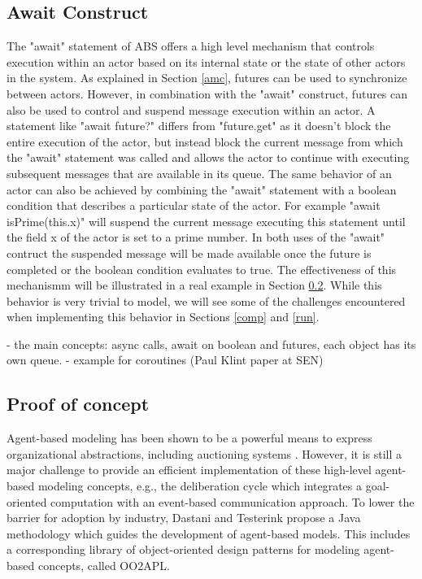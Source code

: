 \subsection{Await Construct}
The "await" statement of ABS offers a high level mechanism that controls execution within an actor based on its internal state or the state of other actors in the system. As explained in Section \ref{amc}, futures can be used to synchronize between actors. However, in combination with the "await" construct, futures can also be used to control and suspend message execution within an actor. A statement like "await future?" differs from "future.get" as it doesn't block the entire execution of the actor, but instead block the current message from which the "await" statement was called and allows the actor to continue with executing subsequent messages that are available in its queue. The same behavior of an actor can also be achieved by combining the "await" statement with a boolean condition that describes a particular state of the actor. For example "await isPrime(this.x)" will suspend the current message executing this statement until the field x of the actor is set to a prime number. In both uses of the "await" contruct the suspended message will be made available once the future is completed or the boolean condition evaluates to true. The effectiveness of this mechanismm will be illustrated in a real example in Section \ref{ag}. While this behavior is very trivial to model, we will see some of the challenges encountered when implementing this behavior in Sections \ref{comp} and \ref{run}.        

- the main concepts: async calls, await on boolean and futures, each object has its own queue.
- example for coroutines (Paul Klint paper at SEN)

\subsection{Proof of concept}
\label{ag}

Agent-based modeling has been shown to be a powerful means to express organizational abstractions, including auctioning systems \cite{agent_auction, bas16}.
However, it is still a major challenge to provide an efficient implementation of these high-level agent-based modeling concepts, e.g., the deliberation cycle which integrates a goal-oriented computation with an event-based communication approach. 
To lower the barrier for adoption by industry, Dastani and Testerink \cite{bas16} propose a Java methodology which guides the development of agent-based models. 
This includes a corresponding library of object-oriented design patterns for modeling agent-based concepts, called OO2APL. 

